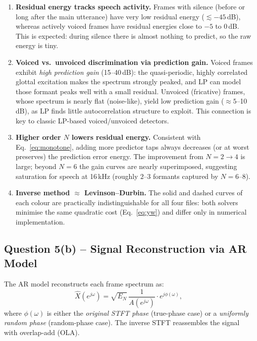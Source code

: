\documentclass[12pt,a4paper,onecolumn]{exam}
\begin{document}
\begin{enumerate}
  \item \textbf{Residual energy tracks speech activity.}
        Frames with silence (before or long after the main utterance)
        have very low residual energy ($\lesssim -45$\,dB), whereas
        actively voiced frames have residual energies close to
        $-5$ to $0$\,dB.  This is expected: during silence there is
        almost nothing to predict, so the raw energy is tiny.

  \item \textbf{Voiced vs.\ unvoiced discrimination via prediction gain.}
        Voiced frames exhibit \emph{high prediction gain} (15--40\,dB):
        the quasi-periodic, highly correlated glottal excitation makes the
        spectrum strongly peaked, and LP can model those formant peaks well
        with a small residual. Unvoiced (fricative) frames, whose spectrum
        is nearly flat (noise-like), yield low prediction gain
        ($\approx5$--10\,dB), as LP finds little autocorrelation structure
        to exploit. This connection is key to classic LP-based voiced/unvoiced
        detectors.

  \item \textbf{Higher order $N$ lowers residual energy.}
        Consistent with Eq.~\eqref{eq:monotone}, adding more predictor
        taps always decreases (or at worst preserves) the prediction error
        energy. The improvement from $N=2\to4$ is large; beyond $N=6$
        the gain curves are nearly superimposed, suggesting saturation
        for speech at 16\,kHz (roughly $2$--$3$ formants captured by
        $N=6$--$8$).

  \item \textbf{Inverse method $\approx$ Levinson--Durbin.}
        The solid and dashed curves of each colour are practically
        indistinguishable for all four files: both solvers minimise
        the same quadratic cost (Eq.~\eqref{eq:yw}) and differ only
        in numerical implementation.
\end{enumerate}

\subsection*{Question 5(b) -- Signal Reconstruction via AR Model}

The AR model reconstructs each frame spectrum as:
\begin{equation}
  \hat{X}(e^{j\omega}) = \sqrt{E_N}\,\frac{1}{A(e^{j\omega})} \cdot e^{j\phi(\omega)},
\end{equation}
where $\phi(\omega)$ is either the \emph{original STFT phase} (true-phase case)
or a \emph{uniformly random phase} (random-phase case).
The inverse STFT reassembles the signal with overlap-add (OLA).
\end{document}
